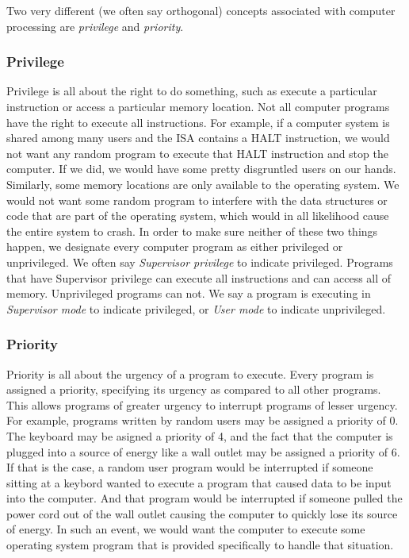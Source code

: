 \documentclass{patt}
\begin{document}
Two very different (we often say orthogonal) concepts associated with computer
processing are {\em privilege} and {\em priority}.  

\subsubsection{Privilege}
Privilege is all about the
right to do something, such as execute a particular instruction or access a
particular memory location.  Not all computer programs have the right to
execute all instructions.  For example, if a computer system is shared among
many users and the ISA contains a HALT instruction, we would not want any
random program to execute that HALT instruction and stop the computer.  If we
did, we  would have some pretty disgruntled users on our hands.  Similarly, 
some memory locations are only available to the operating system.  We would 
not want some random program to interfere with the data structures or code
that are part of the operating system, which would in all likelihood cause
the entire system to crash.  In order to make sure neither of these two 
things happen, we designate every computer program as either privileged or
unprivileged.  We often say {\em Supervisor privilege} to indicate privileged.  
Programs that have Supervisor privilege can execute all instructions and
can access all of memory.  Unprivileged programs can not.  We say a
program is executing in {\em Supervisor mode} to indicate privileged, or 
{\em User mode} to indicate unprivileged.

\subsubsection{Priority}
Priority is all about the urgency of a program to execute.  Every program is
assigned a priority, specifying its urgency as compared to all other programs.
This allows programs of greater urgency to interrupt programs of lesser
urgency.  For example, programs written by random users may be assigned a
priority of 0.  The keyboard may be asigned a priority of 4, and the fact
that the computer is plugged into a source of energy like a wall outlet may
be assigned a priority of 6.  If that is the case, a random user program
would be interrupted if someone sitting at a keybord wanted to execute a
program that caused data to be input into the computer.  And that program
would be interrupted if someone pulled the power cord out of the wall outlet
causing the computer to quickly lose its source of energy.  In such an event,
we would want the computer to execute some operating system program that is
provided specifically to handle that situation.
\end{document}

